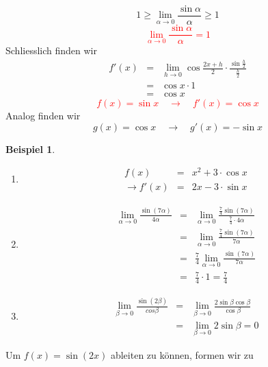 \documentclass{report}
\newtheorem{myexample}{Beispiel}
\begin{document}
\begin{equation}1 \geq \lim_{\alpha \to 0} \frac{\sin \alpha}{\alpha} \geq 1\end{equation}
\textcolor{red}{\begin{equation}\lim_{\alpha \to 0} \frac{\sin \alpha}{\alpha} = 1\end{equation}}
Schliesslich finden wir
\begin{eqnarray}f'(x) & = & \lim_{h \to 0} \cos \frac{2x+h}{2} \cdot \frac{\sin \frac{h}{2}}{\frac{h}{2}} \nonumber \\
& = & \cos x \cdot 1 \nonumber \\
& = & \cos x\end{eqnarray}
\textcolor{red}{\begin{equation}f(x) = \sin x \quad \to \quad f'(x) = \cos x\end{equation}}
Analog finden wir
\begin{equation}g(x) = \cos x \quad \to \quad g'(x) = -\sin x\end{equation}
\begin{myexample}\begin{enumerate}
\item \begin{eqnarray}f(x) & = & x^2 + 3 \cdot \cos x \nonumber \\
\to f'(x) & = & 2x - 3 \cdot \sin x\end{eqnarray}
\item \begin{eqnarray}\lim_{\alpha \to 0} \frac{\sin (7 \alpha)}{4 \alpha} & = & \lim_{\alpha \to 0} \frac{\frac{7}{4} \sin(7 \alpha)}{\frac{7}{4} \cdot 4 \alpha} \nonumber \\
& = & \lim_{\alpha \to 0} \frac{\frac{7}{4} \sin(7 \alpha)}{7 \alpha} \nonumber \\
& = & \frac{7}{4} \lim_{\alpha \to 0} \frac{\sin(7\alpha)}{7 \alpha} \nonumber \\
& = & \frac{7}{4} \cdot 1 = \frac{7}{4}\end{eqnarray}
\item \begin{eqnarray}\lim_{\beta \to 0} \frac{\sin(2\beta)}{cos \beta} & = & \lim_{\beta \to 0} \frac{2 \sin \beta \cos \beta}{\cos \beta} \nonumber \\
& = & \lim_{\beta \to 0} 2 \sin \beta = 0\end{eqnarray}
\end{enumerate}\end{myexample}
Um $f(x) = \sin(2x)$ ableiten zu können, formen wir zu
\end{document}
